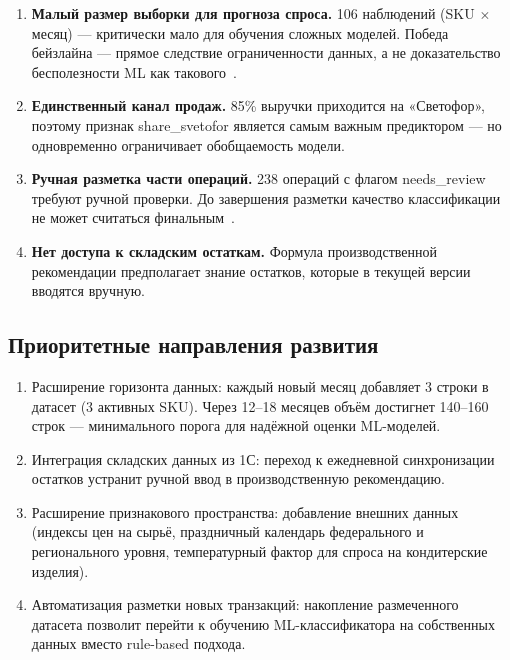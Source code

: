 \begin{enumerate}
  \item \textbf{Малый размер выборки для прогноза спроса.} 106 наблюдений (SKU $\times$ месяц) --- критически мало для обучения сложных моделей. Победа бейзлайна --- прямое следствие ограниченности данных, а не доказательство бесполезности ML как такового~\cite{makridakis2018m4}.

  \item \textbf{Единственный канал продаж.} 85\% выручки приходится на «Светофор», поэтому признак share\_svetofor является самым важным предиктором --- но одновременно ограничивает обобщаемость модели.

  \item \textbf{Ручная разметка части операций.} 238 операций с флагом needs\_review требуют ручной проверки. До завершения разметки качество классификации не может считаться финальным~\cite{kaufman2012leakage}.

  \item \textbf{Нет доступа к складским остаткам.} Формула производственной рекомендации предполагает знание остатков, которые в текущей версии вводятся вручную.
\end{enumerate}

\subsection{Приоритетные направления развития}

\begin{enumerate}
  \item Расширение горизонта данных: каждый новый месяц добавляет 3 строки в датасет (3 активных SKU). Через 12--18 месяцев объём достигнет 140--160 строк --- минимального порога для надёжной оценки ML-моделей.

  \item Интеграция складских данных из 1С: переход к ежедневной синхронизации остатков устранит ручной ввод в производственную рекомендацию.

  \item Расширение признакового пространства: добавление внешних данных (индексы цен на сырьё, праздничный календарь федерального и регионального уровня, температурный фактор для спроса на кондитерские изделия).

  \item Автоматизация разметки новых транзакций: накопление размеченного датасета позволит перейти к обучению ML-классификатора на собственных данных вместо rule-based подхода.
\end{enumerate}
